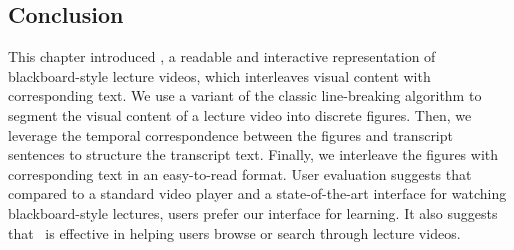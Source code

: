 
\subsection{Conclusion}
This chapter introduced \systemname , a readable and interactive representation of blackboard-style lecture videos, which interleaves visual content with corresponding text. We use a variant of the classic line-breaking algorithm to segment the visual content of a lecture video into discrete figures. Then, we leverage the temporal correspondence between the figures and transcript sentences to structure the transcript text. Finally, we interleave the figures with corresponding text in an easy-to-read format. User evaluation suggests that compared to a standard video player and a state-of-the-art interface for watching blackboard-style lectures, users prefer our interface for learning. It also suggests that \systemname\ is effective in helping users browse or search through lecture videos. 

